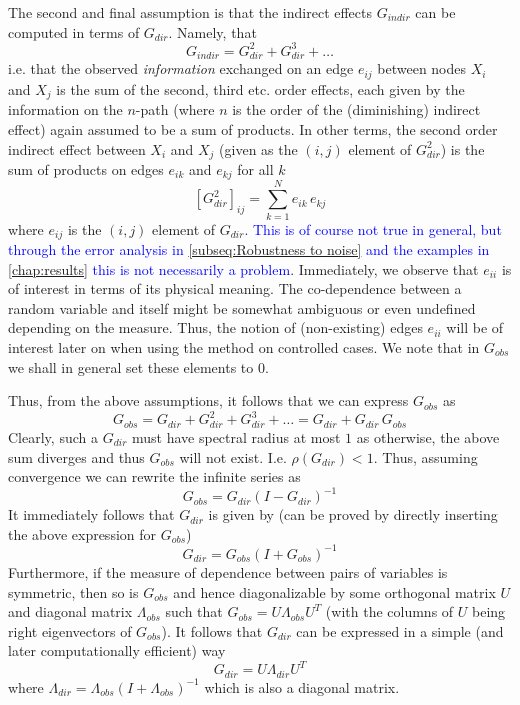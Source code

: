 \documentclass[../Thesis.tex]{subfiles}
\begin{document}
The second and final assumption is that the indirect effects $G_{indir}$ can be computed in terms of $G_{dir}$. Namely, that
\begin{equation}
    G_{indir} = G_{dir}^2 + G_{dir}^3 + \dots
\end{equation}
i.e. that the observed \textit{information} exchanged on an edge $e_{ij}$ between nodes $X_i$ and $X_j$ is the sum of the second, third etc. order effects, each given by the information on the $n$-path (where $n$ is the order of the (diminishing) indirect effect) again assumed to be a sum of products. In other terms, the second order indirect effect between $X_i$ and $X_j$ (given as the $(i,j)$ element of $G_{dir}^2$) is the sum of products on edges $e_{ik}$ and $e_{kj}$ for all $k$
$$\left[G_{dir}^2\right]_{ij} = \sum_{k=1}^N e_{ik}\,e_{kj}$$
where $e_{ij}$ is the $(i,j)$ element of $G_{dir}$. \textcolor{blue}{This is of course not true in general, but through the error analysis in \autoref{subseq:Robustness to noise} and the examples in \autoref{chap:results} this is not necessarily a problem}. Immediately, we observe that $e_{ii}$ is of interest in terms of its physical meaning. The co-dependence between a random variable and itself might be somewhat ambiguous or even undefined depending on the measure. Thus, the notion of (non-existing) edges $e_{ii}$ will be of interest later on when using the method on controlled cases. We note that in $G_{obs}$ we shall in general set these elements to $0$.

Thus, from the above assumptions, it follows that we can express $G_{obs}$ as
\begin{equation}\label{eq:Network Informaiton Convolution}
    G_{obs} = G_{dir} + G_{dir}^2 + G_{dir}^3 + \dots = G_{dir} + G_{dir} \, G_{obs}
\end{equation}
Clearly, such a $G_{dir}$ must have spectral radius at most $1$ as otherwise, the above sum diverges and thus $G_{obs}$ will not exist. I.e. $\rho\left(G_{dir}\right) < 1$. Thus, assuming convergence we can rewrite the infinite series as
\begin{equation}\label{eq:Gobs from Gdir}
    G_{obs} = G_{dir} \left(I - G_{dir}\right)^{-1}
\end{equation}
It immediately follows that $G_{dir}$ is given by (can be proved by directly inserting the above expression for $G_{obs}$)
\begin{equation}\label{eq:Gdir from Gobs}
    G_{dir} = G_{obs} \left(I + G_{obs}\right)^{-1}
\end{equation}
Furthermore, if the measure of dependence between pairs of variables is symmetric, then so is $G_{obs}$ and hence diagonalizable by some orthogonal matrix $U$ and diagonal matrix $\Lambda_{obs}$ such that $G_{obs} = U \Lambda_{obs} U^T$ (with the columns of $U$ being right eigenvectors of $G_{obs}$). It follows that $G_{dir}$ can be expressed in a simple (and later computationally efficient) way
$$G_{dir} = U \Lambda_{dir} U^T$$
where $\Lambda_{dir} = \Lambda_{obs} \left(I + \Lambda_{obs}\right)^{-1}$ which is also a diagonal matrix.
\end{document}
